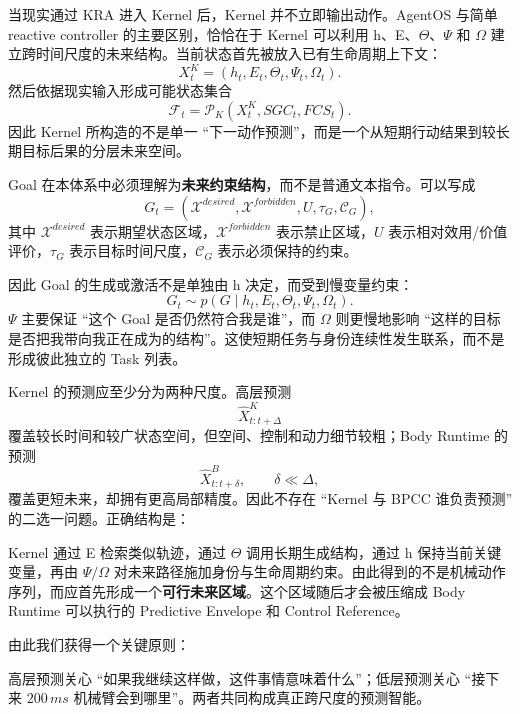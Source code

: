 当现实通过 KRA 进入 Kernel 后，Kernel 并不立即输出动作。AgentOS 与简单 reactive controller 的主要区别，恰恰在于 Kernel 可以利用 h、E、$\Theta$、$\Psi$ 和 $\Omega$ 建立跨时间尺度的未来结构。当前状态首先被放入已有生命周期上下文：
\[
X^K_t
=
\left(
h_t,
E_t,
\Theta_t,
\Psi_t,
\Omega_t
\right).
\]
然后依据现实输入形成可能状态集合
\[
\mathcal F_t
=
\mathcal P_K
\left(
X^K_t,
SGC_t,
FCS_t
\right).
\]
因此 Kernel 所构造的不是单一 ``下一动作预测''，而是一个从短期行动结果到较长期目标后果的分层未来空间。

Goal 在本体系中必须理解为\textbf{未来约束结构}，而不是普通文本指令。可以写成
\[
G_t
=
\left(
\mathcal X^{desired},
\mathcal X^{forbidden},
U,
\tau_G,
\mathcal C_G
\right),
\]
其中 $\mathcal X^{desired}$ 表示期望状态区域，$\mathcal X^{forbidden}$ 表示禁止区域，$U$ 表示相对效用/价值评价，$\tau_G$ 表示目标时间尺度，$\mathcal C_G$ 表示必须保持的约束。

因此 Goal 的生成或激活不是单独由 h 决定，而受到慢变量约束：
\[
G_t
\sim
p\left(
G\mid
h_t,E_t,\Theta_t,\Psi_t,\Omega_t
\right).
\]
$\Psi$ 主要保证 ``这个 Goal 是否仍然符合我是谁''，而 $\Omega$ 则更慢地影响 ``这样的目标是否把我带向我正在成为的结构''。这使短期任务与身份连续性发生联系，而不是形成彼此独立的 Task 列表。

Kernel 的预测应至少分为两种尺度。高层预测
\[
\hat X^K_{t:t+\Delta}
\]
覆盖较长时间和较广状态空间，但空间、控制和动力细节较粗；Body Runtime 的预测
\[
\hat X^B_{t:t+\delta},
\qquad
\delta\ll\Delta ,
\]
覆盖更短未来，却拥有更高局部精度。因此不存在 ``Kernel 与 BPCC 谁负责预测'' 的二选一问题。正确结构是：
\begin{statementbox}
\centering
{}
\end{statementbox}

Kernel 通过 E 检索类似轨迹，通过 $\Theta$ 调用长期生成结构，通过 h 保持当前关键变量，再由 $\Psi/\Omega$ 对未来路径施加身份与生命周期约束。由此得到的不是机械动作序列，而应首先形成一个\textbf{可行未来区域}。这个区域随后才会被压缩成 Body Runtime 可以执行的 Predictive Envelope 和 Control Reference。

由此我们获得一个关键原则：
\begin{statementbox}
\centering
{}
\end{statementbox}
高层预测关心 ``如果我继续这样做，这件事情意味着什么''；低层预测关心 ``接下来 $200\,ms$ 机械臂会到哪里''。两者共同构成真正跨尺度的预测智能。


